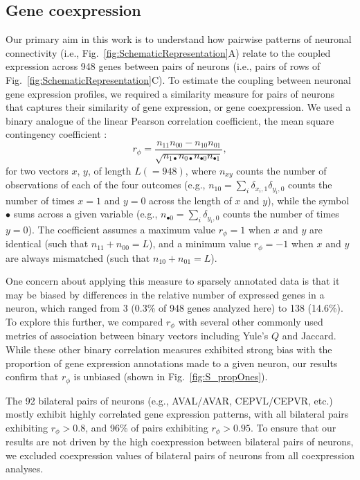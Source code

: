 \documentclass[10pt,letterpaper]{article}
\begin{document}
\subsection*{Gene coexpression}
Our primary aim in this work is to understand how pairwise patterns of neuronal connectivity (i.e., Fig.~\ref{fig:SchematicRepresentation}A) relate to the coupled expression across 948 genes between pairs of neurons (i.e., pairs of rows of Fig.~\ref{fig:SchematicRepresentation}C).
To estimate the coupling between neuronal gene expression profiles, we required a similarity measure for pairs of neurons that captures their similarity of gene expression, or gene coexpression.
We used a binary analogue of the linear Pearson correlation coefficient, the mean square contingency coefficient \cite{Warrens2008}:
\begin{equation} \label{eq:rphi}
    r_\phi = \frac{n_{11}n_{00} - n_{10}n_{01}}{\sqrt{n_{1\bullet}n_{0\bullet}n_{\bullet 0}n_{\bullet 1}}},
\end{equation}
for two vectors $x$, $y$, of length $L (=948)$, where $n_{xy}$ counts the number of observations of each of the four outcomes (e.g., $n_{10} = \sum_i \delta_{x_i,1}\delta_{y_i,0}$ counts the number of times $x=1$ and $y=0$ across the length of $x$ and $y$), while the symbol $\bullet$ sums across a given variable (e.g., $n_{\bullet 0} = \sum_i \delta_{y_i,0}$ counts the number of times $y = 0$).
The coefficient assumes a maximum value $r_\phi = 1$ when $x$ and $y$ are identical (such that $n_{11} + n_{00} = L$), and a minimum value $r_\phi = -1$ when $x$ and $y$ are always mismatched (such that $n_{10} + n_{01} = L$).

One concern about applying this measure to sparsely annotated data is that it may be biased by differences in the relative number of expressed genes in a neuron, which ranged from 3 (0.3\% of 948 genes analyzed here) to 138 (14.6\%).
To explore this further, we compared $r_\phi$ with several other commonly used metrics of association between binary vectors including Yule's $Q$ and Jaccard.
While these other binary correlation measures exhibited strong bias with the proportion of gene expression annotations made to a given neuron, our results confirm that $r_\phi$ is unbiased (shown in Fig.~\ref{fig:S_propOnes}).

The 92 bilateral pairs of neurons (e.g., AVAL/AVAR, CEPVL/CEPVR, etc.) mostly exhibit highly correlated gene expression patterns, with all bilateral pairs exhibiting $r_\phi > 0.8$, and 96\% of pairs exhibiting $r_\phi > 0.95$.
To ensure that our results are not driven by the high coexpression between bilateral pairs of neurons, we excluded coexpression values of bilateral pairs of neurons from all coexpression analyses.
\end{document}
